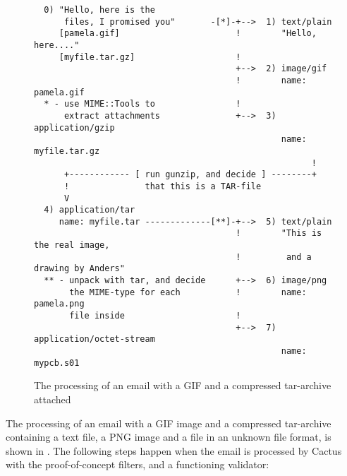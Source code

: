 
\begin{figure}[htbp]
  \begin{center}
\begin{verbatim}
  0) "Hello, here is the
      files, I promised you"       -[*]-+-->  1) text/plain
     [pamela.gif]                       !        "Hello, here...."
     [myfile.tar.gz]                    !
                                        +-->  2) image/gif
                                        !        name:  pamela.gif
  * - use MIME::Tools to                !
      extract attachments               +-->  3) application/gzip
                                                 name:  myfile.tar.gz
                                                       !
      +------------ [ run gunzip, and decide ] --------+
      !               that this is a TAR-file
      V
  4) application/tar
     name: myfile.tar -------------[**]-+-->  5) text/plain
                                        !        "This is the real image,
                                        !         and a drawing by Anders"
  ** - unpack with tar, and decide      +-->  6) image/png
       the MIME-type for each           !        name: pamela.png
       file inside                      !
                                        +-->  7) application/octet-stream
                                                 name: mypcb.s01
\end{verbatim}
    \caption{The processing of an email with a GIF and a compressed tar-archive attached}
    \label{fig:xexample}
  \end{center}
\end{figure}


The processing of an email with a GIF image and a compressed
tar-archive containing a text file, a PNG image and a file in an
unknown file format, is shown in .  The
following steps happen when the email is processed by Cactus with the
proof-of-concept filters, and a functioning validator:

